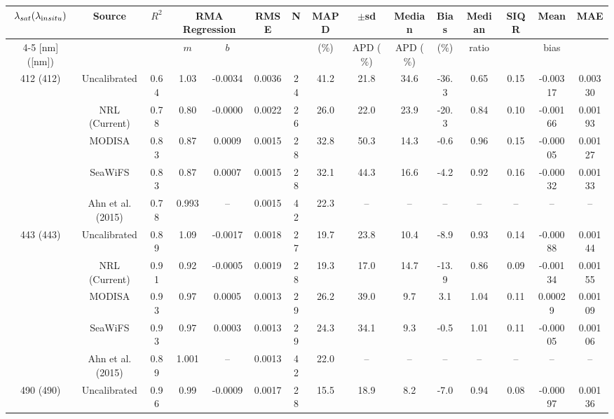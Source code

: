 \documentclass[preview]{standalone}
\begin{document}
\centering
\begin{tabular}{ccccccccccccccc} 
 \hline 
$\lambda_{sat} (\lambda_{\text in situ})$ & Source & $R^2$ & \multicolumn{2}{c}{RMA Regression} & RMSE & N & MAPD & $\pm$sd & Median & Bias & Median & SIQR & Mean & MAE\\ \cline{4-5}
[nm]([nm])                  &              &         & $m$     & $b$     &             &     & ($\%$)  & APD ($\%$)  & APD ($\%$)  & ($\%$)   & ratio   &  & bias&       \\ \hline 
 \hline  
\multirow{5}{*}{412 (412)} 	& Uncalibrated 	& 0.64 & 1.03 & -0.0034 & 0.0036 & 24 & 41.2 & 21.8 & 34.6 & -36.3 & 0.65 & 0.15 & -0.00317 	& 0.00330 \\ 
							& NRL (Current)	& 0.78 & 0.80 & -0.0000 & 0.0022 & 26 & 26.0 & 22.0 & 23.9 & -20.3 & 0.84 &  0.10 & -0.00166 	& 0.00193\\
							& MODISA 		& 0.83 & 0.87 & 0.0009  & 0.0015 & 28 & 32.8 & 50.3 & 14.3 & -0.6 & 0.96 & 0.15& -0.00005 		& 0.00127 \\ 
							& SeaWiFS 		& 0.83 & 0.87 & 0.0007  & 0.0015 & 28 & 32.1 & 44.3 & 16.6 & -4.2 & 0.92 & 0.16 & -0.00032		& 0.00133\\ 
							& Ahn et al. (2015) & 0.78 & 0.993 & -- & 0.0015 & 42 & 22.3 & -- & -- & -- & -- & -- & -- & -- \\ \hline
\multirow{5}{*}{443 (443)} 	& Uncalibrated 	& 0.89 & 1.09 & -0.0017 & 0.0018 & 27 & 19.7 & 23.8 & 10.4 & -8.9 & 0.93 & 0.14  & -0.00088 	& 0.00144 \\ 
							& NRL (Current)	& 0.91 & 0.92 & -0.0005 & 0.0019 & 28 & 19.3 & 17.0 & 14.7 & -13.9 & 0.86 & 0.09 & -0.00134 	& 0.00155\\
 							& MODISA 		& 0.93 & 0.97 & 0.0005  & 0.0013 & 29 & 26.2 & 39.0 & 9.7  & 3.1 & 1.04 & 0.11 &  0.00029 		& 0.00109 \\ 
 							& SeaWiFS 		& 0.93 & 0.97 & 0.0003  & 0.0013 & 29 & 24.3 & 34.1 &  9.3 &  -0.5 & 1.01 & 0.11 & -0.00005		& 0.00106\\ 
 							& Ahn et al. (2015) & 0.89 & 1.001 & -- & 0.0013 & 42 & 22.0 & -- & -- & -- & -- & -- & -- & -- \\ \hline
\multirow{5}{*}{490 (490)} 	& Uncalibrated 	& 0.96 & 0.99 & -0.0009 & 0.0017 & 28 & 15.5 & 18.9 & 8.2 & -7.0 & 0.94 & 0.08 & -0.00097 		& 0.00136 \\ 

\end{tabular}
\end{document}
